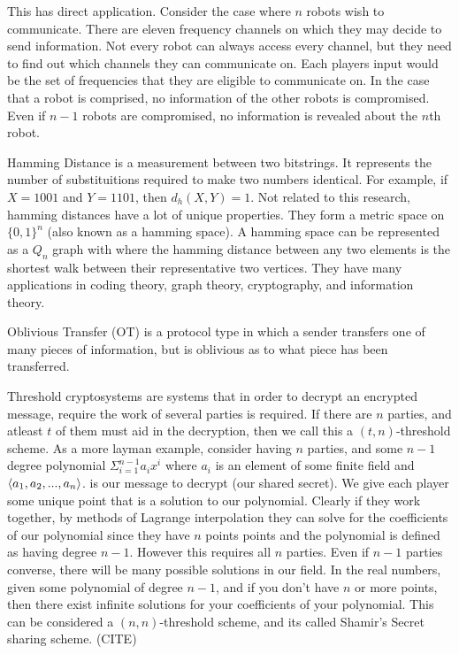 \documentclass[12pt]{article}
\begin{document}
This has direct application. Consider the case where $n$ robots wish to communicate. There are eleven frequency channels on which they may decide to send information. Not every robot can always access every channel, but they need to find out which channels they can communicate on. Each players input would be the set of frequencies that they are eligible to communicate on. In the case that a robot is comprised, no information of the other robots is compromised. Even if $n-1$ robots are compromised, no information is revealed about the $n$th robot.

Hamming Distance is a measurement between two bitstrings. It represents the number of substituitions required to make two numbers identical. For example, if $X = 1001$ and $Y = 1101$, then $d_h(X,Y) = 1$. Not related to this research, hamming distances have a lot of unique properties. They form a metric space on $\{0,1\}^n$ (also known as a hamming space). A hamming space can be represented as a $Q_n$ graph with where the hamming distance between any two elements is the shortest walk between their representative two vertices. They have many applications in coding theory, graph theory, cryptography, and information theory.

Oblivious Transfer (OT) is a protocol type in which a sender transfers one of many pieces of information, but is oblivious as to what piece has been transferred.

Threshold cryptosystems are systems that in order to decrypt an encrypted message, require the work of several parties is required. If there are $n$ parties, and atleast $t$ of them must aid in the decryption, then we call this a $(t,n)$-threshold scheme. As a more layman example, consider having $n$ parties, and some $n-1$ degree polynomial $\Sigma_{i=1}^{n-1} a_i x^i$ where $a_i$ is an element of some finite field and $\braket{a_1,a_2,...,a_n}$. is our message to decrypt (our shared secret). We give each player some unique point that is a solution to  our polynomial. Clearly if they work together, by methods of Lagrange interpolation they can solve for the coefficients of our polynomial since they have $n$ points points and the polynomial is defined as having degree $n-1$. However this requires all $n$ parties. Even if $n-1$ parties converse, there will be many possible solutions in our field. In the real numbers, given some polynomial of degree $n-1$, and if you don't have $n$ or more points, then there exist infinite solutions for your coefficients of your polynomial. This can be considered a $(n,n)$-threshold scheme, and its called Shamir's Secret sharing scheme. (CITE)
\end{document}
